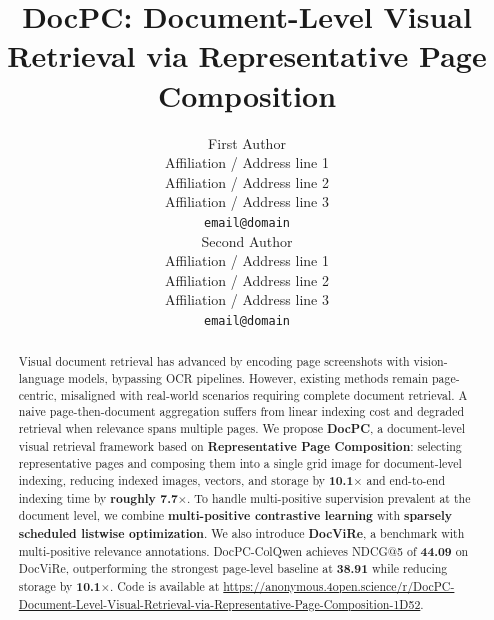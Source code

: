 \documentclass[11pt]{article}
\title{DocPC: Document-Level Visual Retrieval via Representative Page Composition}
\author{First Author \\
  Affiliation / Address line 1 \\
  Affiliation / Address line 2 \\
  Affiliation / Address line 3 \\
  \texttt{email@domain} \\\And
  Second Author \\
  Affiliation / Address line 1 \\
  Affiliation / Address line 2 \\
  Affiliation / Address line 3 \\
  \texttt{email@domain} \\}
\begin{document}
\maketitle
\begin{abstract}
Visual document retrieval has advanced by encoding page screenshots with vision-language models, bypassing OCR pipelines. However, existing methods remain page-centric, misaligned with real-world scenarios requiring complete document retrieval. A naive page-then-document aggregation suffers from linear indexing cost and degraded retrieval when relevance spans multiple pages. We propose \textbf{DocPC}, a document-level visual retrieval framework based on \textbf{Representative Page Composition}: selecting representative pages and composing them into a single grid image for document-level indexing, reducing indexed images, vectors, and storage by \textbf{10.1$\times$} and end-to-end indexing time by \textbf{roughly 7.7$\times$}. To handle multi-positive supervision prevalent at the document level, we combine \textbf{multi-positive contrastive learning} with \textbf{sparsely scheduled listwise optimization}. We also introduce \textbf{DocViRe}, a benchmark with multi-positive relevance annotations. DocPC-ColQwen achieves NDCG@5 of \textbf{44.09} on DocViRe, outperforming the strongest page-level baseline at \textbf{38.91} while reducing storage by \textbf{10.1$\times$}. Code is available at \url{https://anonymous.4open.science/r/DocPC-Document-Level-Visual-Retrieval-via-Representative-Page-Composition-1D52}.
\end{abstract}










%


\clearpage
\appendix

\end{document}

